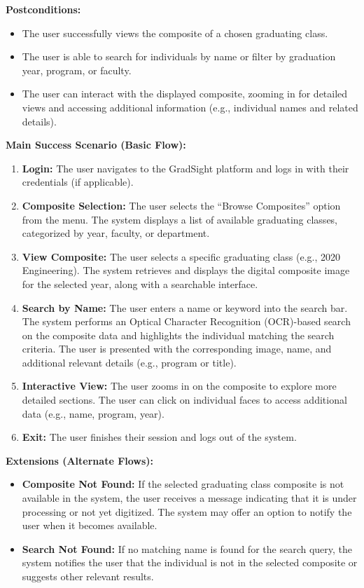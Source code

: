 \documentclass[12pt]{article}
\begin{document}
\textbf{Postconditions:}
\begin{itemize}
  \item The user successfully views the composite of a chosen graduating class.
  \item The user is able to search for individuals by name or filter by graduation year, program, or faculty.
  \item The user can interact with the displayed composite, zooming in for detailed views and accessing additional information (e.g., individual names and related details).
\end{itemize}

\textbf{Main Success Scenario (Basic Flow):}
\begin{enumerate}
  \item \textbf{Login:} The user navigates to the GradSight platform and logs in with their credentials (if applicable).
  \item \textbf{Composite Selection:} The user selects the “Browse Composites” option from the menu. The system displays a list of available graduating classes, categorized by year, faculty, or department.
  \item \textbf{View Composite:} The user selects a specific graduating class (e.g., 2020 Engineering). The system retrieves and displays the digital composite image for the selected year, along with a searchable interface.
  \item \textbf{Search by Name:} The user enters a name or keyword into the search bar. The system performs an Optical Character Recognition (OCR)-based search on the composite data and highlights the individual matching the search criteria. The user is presented with the corresponding image, name, and additional relevant details (e.g., program or title).
  \item \textbf{Interactive View:} The user zooms in on the composite to explore more detailed sections. The user can click on individual faces to access additional data (e.g., name, program, year).
  \item \textbf{Exit:} The user finishes their session and logs out of the system.
\end{enumerate}

\textbf{Extensions (Alternate Flows):}
\begin{itemize}
  \item \textbf{Composite Not Found:} If the selected graduating class composite is not available in the system, the user receives a message indicating that it is under processing or not yet digitized. The system may offer an option to notify the user when it becomes available.
  \item \textbf{Search Not Found:} If no matching name is found for the search query, the system notifies the user that the individual is not in the selected composite or suggests other relevant results.
\end{itemize}
\end{document}
